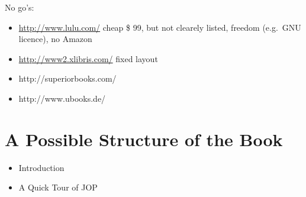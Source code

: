 No go's:
\begin{itemize}
    \item \url{http://www.lulu.com/} cheap \$ 99, but not clearely
    listed, freedom (e.g.\ GNU licence), no Amazon
    \item \url{http://www2.xlibris.com/} fixed layout
    \item http://superiorbooks.com/
    \item http://www.ubooks.de/
\end{itemize}



\section{A Possible Structure of the Book}

\begin{itemize}
    \item Introduction
    \item A Quick Tour of JOP


\end{itemize}
